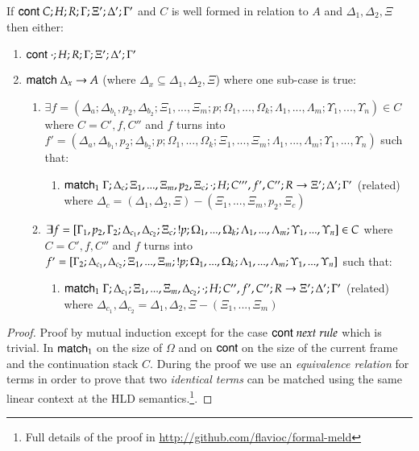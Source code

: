 \begin{theorem}
If $\mathsf{cont} \; C; H; R; \Gamma; \Xi'; \Delta'; \Gamma'$ and $C$ is well formed in relation to $A$ and $\Delta_1, \Delta_2, \Xi$ then either:

\begin{enumerate}
   \item $\mathsf{cont} \; \cdot; H; R; \Gamma; \Xi'; \Delta'; \Gamma'$
   \item $\mathsf{match} \; \Delta_x \rightarrow A$ (where $\Delta_x \subseteq \Delta_1, \Delta_2, \Xi$) where one sub-case is true:
   \begin{enumerate}
      \item $\exists f = (\Delta_a; \Delta_{b_1}, p_2, \Delta_{b_2}; \Xi_1, ..., \Xi_m; p; \Omega_1, ..., \Omega_k; \Lambda_1, ..., \Lambda_m; \Upsilon_1, ..., \Upsilon_n) \in C$ where $C = C', f, C''$ and $f$ turns into $f' = (\Delta_a, \Delta_{b_1}, p_2; \Delta_{b_2}; p; \Omega_1, ..., \Omega_k; \Xi_1, ..., \Xi_m; \Lambda_1, ..., \Lambda_m; \Upsilon_1, ..., \Upsilon_n)$ such that:
      \begin{enumerate}
         \item $\mathsf{match}_1 \; \Gamma; \Delta_c; \Xi_1, ..., \Xi_m, p_2, \Xi_c; \cdot; H; C''', f', C''; R \rightarrow \Xi'; \Delta'; \Gamma'$ (related) where $\Delta_c = (\Delta_1, \Delta_2, \Xi) - (\Xi_1, ..., \Xi_m, p_2, \Xi_c)$
      \end{enumerate}
      \item $\exists f = [\Gamma_1, p_2, \Gamma_2; \Delta_{c_1}, \Delta_{c_2}; \Xi_c; {!} p; \Omega_1, ..., \Omega_k; \Lambda_1, ..., \Lambda_m; \Upsilon_1, ..., \Upsilon_n] \in C$ where $C = C', f, C''$ and $f$ turns into $f' = [\Gamma_2; \Delta_{c_1}, \Delta_{c_2}; \Xi_1, ..., \Xi_m; {!} p; \Omega_1, ..., \Omega_k; \Lambda_1, ..., \Lambda_m; \Upsilon_1, ..., \Upsilon_n]$ such that:
      \begin{enumerate}
         \item $\mathsf{match}_1 \; \Gamma; \Delta_{c_1}; \Xi_1, ..., \Xi_m, \Delta_{c_2}; \cdot; H; C'', f', C''; R \rightarrow \Xi'; \Delta'; \Gamma'$ (related) where $\Delta_{c_1}, \Delta_{c_2} = \Delta_1, \Delta_2, \Xi - (\Xi_1, ..., \Xi_m)$
      \end{enumerate}
   \end{enumerate}
\end{enumerate}
\end{theorem}
\begin{proof}
Proof by mutual induction except for the case $\mathsf{cont} \; next \; rule$ which is trivial. In $\mathsf{match}_1 \;$on the size of $\Omega$ and on $\mathsf{cont} \;$on the size of the current frame and the continuation stack $C$. During the proof we use an \emph{equivalence relation} for terms in order to prove that two \emph{identical terms} can be matched using the same linear context at the HLD semantics.\footnote{Full details of the proof in \url{http://github.com/flavioc/formal-meld}}.
\end{proof}